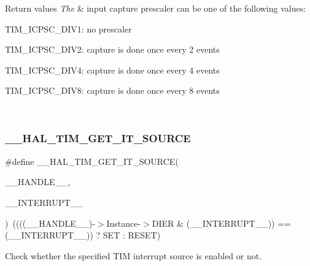 \begin{DoxyRetVals}{Return values}
{\em The} & input capture prescaler can be one of the following values\+: \begin{DoxyItemize}
\item T\+I\+M\+\_\+\+I\+C\+P\+S\+C\+\_\+\+D\+I\+V1\+: no prescaler \item T\+I\+M\+\_\+\+I\+C\+P\+S\+C\+\_\+\+D\+I\+V2\+: capture is done once every 2 events \item T\+I\+M\+\_\+\+I\+C\+P\+S\+C\+\_\+\+D\+I\+V4\+: capture is done once every 4 events \item T\+I\+M\+\_\+\+I\+C\+P\+S\+C\+\_\+\+D\+I\+V8\+: capture is done once every 8 events \end{DoxyItemize}
\\
\hline
\end{DoxyRetVals}
\mbox{\label{group___t_i_m___exported___macros_ga644babf93470a6eee6bce8906c4da5c5}} 
\subsubsection{\texorpdfstring{\_\_HAL\_TIM\_GET\_IT\_SOURCE}{\_\_HAL\_TIM\_GET\_IT\_SOURCE}}
{\footnotesize\ttfamily \#define \+\_\+\+\_\+\+H\+A\+L\+\_\+\+T\+I\+M\+\_\+\+G\+E\+T\+\_\+\+I\+T\+\_\+\+S\+O\+U\+R\+CE(\begin{DoxyParamCaption}\item[{}]{\+\_\+\+\_\+\+H\+A\+N\+D\+L\+E\+\_\+\+\_\+,  }\item[{}]{\+\_\+\+\_\+\+I\+N\+T\+E\+R\+R\+U\+P\+T\+\_\+\+\_\+ }\end{DoxyParamCaption})~((((\+\_\+\+\_\+\+H\+A\+N\+D\+L\+E\+\_\+\+\_\+)-\/$>$Instance-\/$>$D\+I\+ER \& (\+\_\+\+\_\+\+I\+N\+T\+E\+R\+R\+U\+P\+T\+\_\+\+\_\+)) == (\+\_\+\+\_\+\+I\+N\+T\+E\+R\+R\+U\+P\+T\+\_\+\+\_\+)) ? S\+ET \+: R\+E\+S\+ET)}



Check whether the specified T\+IM interrupt source is enabled or not. 


